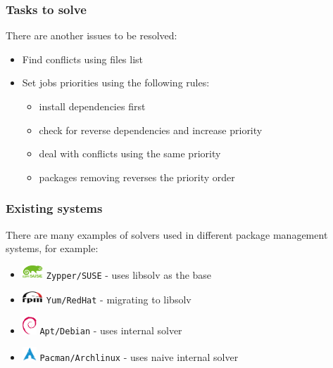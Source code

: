 \documentclass{beamer}
\begin{document}
\begin{frame}
\frametitle{Tasks to solve}
There are another issues to be resolved:
\begin{itemize}
  \item Find conflicts using files list
  \item Set jobs priorities using the following rules:
  \begin{itemize}
    \item install dependencies first
    \item check for reverse dependencies and increase priority
    \item deal with conflicts using the same priority
    \item packages removing reverses the priority order
  \end{itemize}
\end{itemize}
\end{frame}

\begin{frame}
\frametitle{Existing systems}

There are many examples of solvers used in different package management systems,
for example:
\begin{itemize}
  \item \includegraphics[width=22pt]{suse.pdf} \hspace{5pt} \texttt{Zypper/SUSE}
  - uses libsolv as the base
  \item \includegraphics[width=22pt]{rpm.pdf} \hspace{5pt} \texttt{Yum/RedHat} -
  migrating to libsolv
  \item \includegraphics[width=15pt]{debian.pdf} \hspace{12pt}
  \texttt{Apt/Debian} - uses internal solver
  \item \includegraphics[width=15pt]{arch.pdf} \hspace{12pt}
  \texttt{Pacman/Archlinux} - uses naive internal solver
\end{itemize}

\end{frame}
\end{document}

